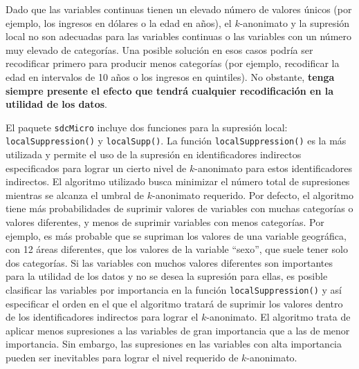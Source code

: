 \documentclass[
]{book}
\theoremstyle{definition}
\theoremstyle{definition}
\theoremstyle{definition}
\theoremstyle{definition}
\theoremstyle{remark}
\begin{document}
Dado que las variables continuas tienen un elevado número de valores únicos (por ejemplo, los ingresos en dólares o la edad en años), el \(k\)-anonimato y la supresión local no son adecuadas para las variables continuas o las variables con un número muy elevado de categorías. Una posible solución en esos casos podría ser recodificar primero para producir menos categorías (por ejemplo, recodificar la edad en intervalos de 10 años o los ingresos en quintiles). No obstante, \textbf{tenga siempre presente el efecto que tendrá cualquier recodificación en la utilidad de los datos}.

El paquete \texttt{sdcMicro} incluye dos funciones para la supresión local: \texttt{localSuppression()} y \texttt{localSupp()}. La función \texttt{localSuppression()} es la más utilizada y permite el uso de la supresión en identificadores indirectos especificados para lograr un cierto nivel de \(k\)-anonimato para estos identificadores indirectos. El algoritmo utilizado busca minimizar el número total de supresiones mientras se alcanza el umbral de \(k\)-anonimato requerido. Por defecto, el algoritmo tiene más probabilidades de suprimir valores de variables con muchas categorías o valores diferentes, y menos de suprimir variables con menos categorías. Por ejemplo, es más probable que se supriman los valores de una variable geográfica, con 12 áreas diferentes, que los valores de la variable ``sexo'', que suele tener solo dos categorías. Si las variables con muchos valores diferentes son importantes para la utilidad de los datos y no se desea la supresión para ellas, es posible clasificar las variables por importancia en la función \texttt{localSuppression()} y así especificar el orden en el que el algoritmo tratará de suprimir los valores dentro de los identificadores indirectos para lograr el \(k\)-anonimato. El algoritmo trata de aplicar menos supresiones a las variables de gran importancia que a las de menor importancia. Sin embargo, las supresiones en las variables con alta importancia pueden ser inevitables para lograr el nivel requerido de \(k\)-anonimato.
\end{document}
